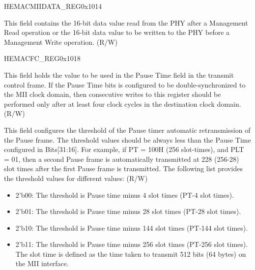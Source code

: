 \begin{register}{H}{EMACMIIDATA\_REG}{0x1014}\label{regdesc:EMACMIIDATAREG}
%
%
\regnewline%
\begin{regdesc}\begin{reglist}
\item [MII\_DATA]This field contains the 16-bit data value read from the PHY after a Management Read operation or the 16-bit data value to be written to the PHY before a Management Write operation. (R/W)
\end{reglist}\end{regdesc}
\end{register}


\begin{register}{H}{EMACFC\_REG}{0x1018}\label{regdesc:EMACFCREG}
%
%
%
%
%
%
%
\regnewline%
\begin{regdesc}\begin{reglist}
\item [PAUSE\_TIME]This field holds the value to be used in the Pause Time field in the transmit control frame. If the Pause Time bits is configured to be double-synchronized to the MII clock domain, then consecutive writes to this register should be performed only after at least four clock cycles in the destination clock domain. (R/W)
\item [PLT]This field configures the threshold of the Pause timer automatic retransmission of the Pause frame. The threshold values should be always less than the Pause Time configured in Bits[31:16]. For example, if PT = 100H (256 slot-times), and PLT = 01, then a second Pause frame is automatically transmitted at 228 (256-28) slot times after the first Pause frame is transmitted. The following list provides the threshold values for different values: (R/W)  \begin{itemize}
\item 2'b00: The threshold is Pause time minus 4 slot times (PT-4 slot times). \item 2'b01: The threshold is Pause time minus 28 slot times (PT-28 slot times). \item 2'b10: The threshold is Pause time minus 144 slot times (PT-144 slot times).  \item 2'b11: The threshold is Pause time minus 256 slot times (PT-256 slot times). The slot time is defined as the time taken to transmit 512 bits (64 bytes) on the MII interface. \end{itemize}

\end{reglist}
\end{regdesc}
\end{register}
